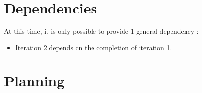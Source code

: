 \documentclass[a4paper, 12pt]{report}
\begin{document}
			
			
			\section {Dependencies}
			
			At this time, it is only possible to provide 1 general dependency :
			
			\begin{itemize}
				
				\item Iteration 2 depends on the completion of iteration 1.
				
			\end{itemize}
			
			
			\section{Planning}	
				
			
			
			
	
\end{document}
